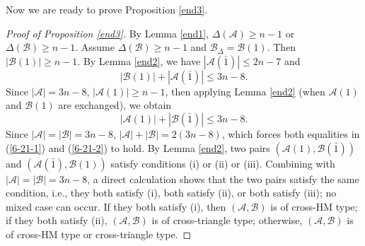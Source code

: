 \documentclass[a4paper,11pt]{article}
\newtheorem{proposition}[theorem]{Proposition}
\newcommand{\m}{\mathcal}
\begin{document}
Now we are ready to prove Proposition \ref{end3}. 
\begin{proof}[Proof of Proposition \ref{end3}]
By Lemma \ref{end1}, $\Delta(\m A)\ge n-1$ or $\Delta(\m B)\ge n-1$. 
Assume $\Delta(\m B)\ge n-1$ and $\m B_{\Delta}=\m B(1)$. Then $|\m B(1)|\ge n-1$. By Lemma \ref{end2}, we have $|\m A(\bar1)|\le 2n-7$ and 
\begin{equation}\label{6-21-1}
|\m B(1)|+|\m A(\bar1)|\le 3n-8.
\end{equation}
Since $|\m A|= 3n-8$, $|\m A(1)|\ge n-1$, then applying Lemma \ref{end2} (when $\m A(1)$ and $\m B(1)$ are exchanged), we obtain 
\begin{equation}\label{6-21-2}
|\m A(1)|+|\m B(\bar1)|\le 3n-8.
\end{equation}
Since $|\m A|=|\m B|=3n-8$, $|\m A|+|\m B|=2(3n-8)$, which forces both equalities in (\ref{6-21-1}) and (\ref{6-21-2}) to hold. By Lemma \ref{end2}, two pairs $(\m A(1), \m B(\bar1))$ and $(\m A(\bar1), \m B(1))$ satisfy conditions (i) or (ii) or (iii). 
Combining with $|\m A|=|\m B|=3n-8$, a direct calculation shows that the two pairs satisfy the same condition, i.e., they both satisfy (i), both satisfy (ii), or both satisfy (iii); no mixed case can occur. If they both satisfy (i), then $(\m A, \m B)$ is of cross-HM type; if they both satisfy (ii), $(\m A, \m B)$ is of cross-triangle type; otherwise, $(\m A, \m B)$ is of cross-HM type or cross-triangle type.
\end{proof}
\end{document}
